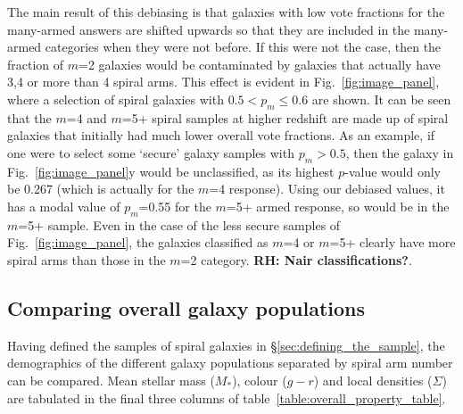 \documentclass[useAMS,usenatbib]{mn2e}
\newcommand{\rh}[1]{{\bf \textcolor{RoyalPurple}{RH: #1}}}
\begin{document}
The main result of this debiasing is that galaxies with low vote fractions for the many-armed answers are shifted upwards so that they are included in the many-armed categories when they were not before. If this were not the case, then the fraction of $m$=2 galaxies would be contaminated by galaxies that actually have 3,4 or more than 4 spiral arms. This effect is evident in Fig.~\ref{fig:image_panel}, where a selection of spiral galaxies with $0.5 < p_m \leq 0.6$ are shown. It can be seen that the $m$=4 and $m$=5+ spiral samples at higher redshift are made up of spiral galaxies that initially had much lower overall vote fractions. As an example, if one were to select some `secure' galaxy samples with $p_m>0.5$, then the galaxy in Fig.~\ref{fig:image_panel}y would be unclassified, as its highest $p$-value would only be 0.267 (which is actually for the $m$=4 response). Using our debiased values, it has a modal value of $p_m$=0.55 for the $m$=5+ armed response, so would be in the $m$=5+ sample. Even in the case of the less secure samples of Fig.~\ref{fig:image_panel}, the galaxies classified as $m$=4 or $m$=5+ clearly have more spiral arms than those in the $m$=2 category. \rh{Nair classifications?}.

\subsection{Comparing overall galaxy populations}
\label{sec:comparison}

Having defined the samples of spiral galaxies in \S\ref{sec:defining_the_sample}, the demographics of the different galaxy populations separated by spiral arm number can be compared. Mean stellar mass ($M_*$), colour ($g-r$) and local densities ($\Sigma$) are tabulated in the final three columns of table~\ref{table:overall_property_table}.
\end{document}
